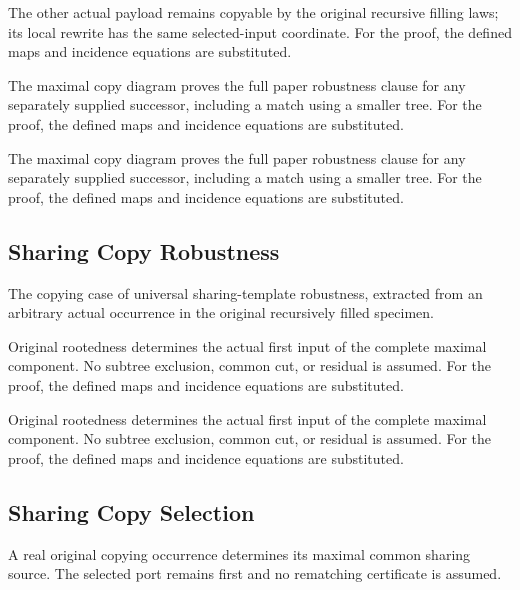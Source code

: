 The other actual payload remains copyable by the original recursive filling laws; its local rewrite has the same selected-input coordinate.
For the proof, the defined maps and incidence equations are substituted.
\par{}

The maximal copy diagram proves the full paper robustness clause for any separately supplied successor, including a match using a smaller tree.
For the proof, the defined maps and incidence equations are substituted.
\par{}

The maximal copy diagram proves the full paper robustness clause for any separately supplied successor, including a match using a smaller tree.
For the proof, the defined maps and incidence equations are substituted.
\par{}

\subsection{Sharing Copy Robustness}
The copying case of universal sharing-template robustness, extracted from an arbitrary actual occurrence in the original recursively filled specimen.

Original rootedness determines the actual first input of the complete maximal component. No subtree exclusion, common cut, or residual is assumed.
For the proof, the defined maps and incidence equations are substituted.
\par{}

Original rootedness determines the actual first input of the complete maximal component. No subtree exclusion, common cut, or residual is assumed.
For the proof, the defined maps and incidence equations are substituted.
\par{}

\subsection{Sharing Copy Selection}
A real original copying occurrence determines its maximal common sharing source. The selected port remains first and no rematching certificate is assumed.

